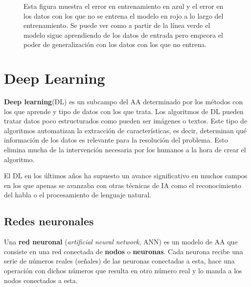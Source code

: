 \begin{figure}[h]
\noindent
{}
\caption{ Esta figura muestra el error en entrenamiento en azul y el error en los datos con los que no se entrena el modelo en rojo a lo largo del entrenamiento. Se puede ver como a partir de la línea verde el modelo sigue aprendiendo de los datos de entrada pero empeora el poder de generalización con los datos con los que no entrena.}
\label{fig:sobreentrenamiento}
\end{figure}

\section{Deep Learning}
\textbf{Deep learning}(DL) \cite{DeepLearningFoundationsConcepts, Goodfellow-et-al-2016, LeCun-Yann-Bengio, UnderstandingDeepLearning, Schmidhuber_2015} es un subcampo del AA determinado por los métodos con los que aprende y tipo de datos con los que trata. Los algoritmos de DL pueden tratar datos poco estructurados como pueden ser imágenes o textos. Este tipo de algoritmos automatizan la extracción de características, es decir, determinan qué información de los datos es relevante para la resolución del problema. Esto elimina mucha de la intervención necesaria por los humanos a la hora de crear el algoritmo.

El DL en los últimos años ha supuesto un avance significativo en muchos campos en los que apenas se avanzaba con otras técnicas de IA como el reconocimiento del habla o el procesamiento de lenguaje natural.

\subsection*{Redes neuronales}
Una \textbf{red neuronal} (\textit{artificial neural network}, ANN) \cite{NNPatternRecogLibro,Haykin,NNTricks} es un modelo de AA que consiste en una red conectada de \textbf{nodos} o \textbf{neuronas}. Cada neurona recibe una serie de números reales (señales) de las neuronas conectadas a esta, hace una operación con dichos números que resulta en otro número real y lo manda a los nodos conectados a esta. 

